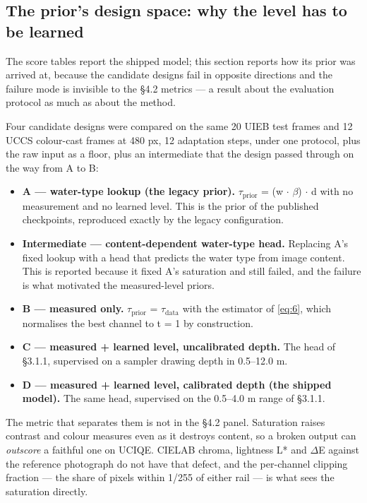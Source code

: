 \documentclass[journal]{IEEEtran}
\begin{document}
\subsection{The prior's design space: why the level has to be learned}
The score tables report the shipped model; this section reports how its prior was arrived at, because the candidate designs fail in opposite directions and the failure mode is invisible to the \S{}4.2 metrics --- a result about the evaluation protocol as much as about the method.

Four candidate designs were compared on the same 20 UIEB test frames and 12 UCCS colour-cast frames at 480 px, 12 adaptation steps, under one protocol, plus the raw input as a floor, plus an intermediate that the design passed through on the way from A to B:

\begin{itemize}
\item \textbf{A --- water-type lookup (the legacy prior).} $\tau_{\mathrm{prior}}$ = (w $\cdot$ $\beta$) $\cdot$ d with no measurement and no learned level. This is the prior of the published checkpoints, reproduced exactly by the legacy configuration.
\item \textbf{Intermediate --- content-dependent water-type head.} Replacing A's fixed lookup with a head that predicts the water type from image content. This is reported because it fixed A's saturation and still failed, and the failure is what motivated the measured-level priors.
\item \textbf{B --- measured only.} $\tau_{\mathrm{prior}}$ = $\tau_{\mathrm{data}}$ with the estimator of \eqref{eq:6}, which normalises the best channel to t = 1 by construction.
\item \textbf{C --- measured + learned level, uncalibrated depth.} The head of \S{}3.1.1, supervised on a sampler drawing depth in 0.5--12.0 m.
\item \textbf{D --- measured + learned level, calibrated depth (the shipped model).} The same head, supervised on the 0.5--4.0 m range of \S{}3.1.1.
\end{itemize}
The metric that separates them is not in the \S{}4.2 panel. Saturation raises contrast and colour measures even as it destroys content, so a broken output can \emph{outscore} a faithful one on UCIQE. CIELAB chroma, lightness L* and $\Delta$E against the reference photograph do not have that defect, and the per-channel clipping fraction --- the share of pixels within 1/255 of either rail --- is what sees the saturation directly.
\end{document}
